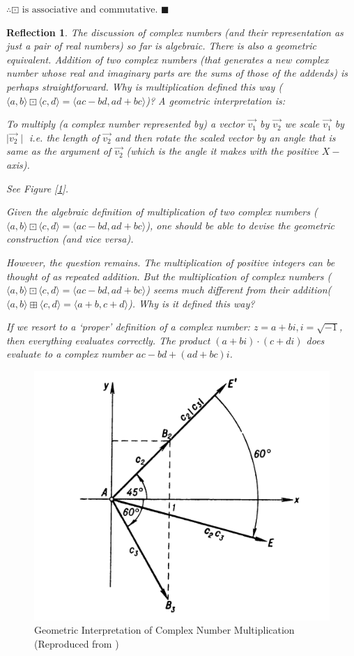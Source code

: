 \documentclass[english,notitlepage,smartquotes]{hgbreport}
\theoremstyle{definition}
\theoremstyle{problem}
\theoremstyle{remark}
\theoremstyle{plain}
\renewcommand\qedsymbol{$\blacksquare$}
\newtheorem{reflection}{Reflection}
\begin{document}
$\therefore \boxdot \text{ is associative and commutative}$. 
\qedsymbol
\begin{reflection}
The discussion of complex numbers (and their representation as just a pair of real numbers) so far is algebraic. There is also a geometric equivalent. Addition of two complex numbers (that generates a new complex number whose real and imaginary parts are the sums of those of the addends) is perhaps straightforward. Why is multiplication defined this way ($\langle a,b\rangle\boxdot\langle c,d\rangle=\langle ac-bd,ad+bc\rangle$)? A geometric interpretation is:
\begin{sidebar}
To multiply (a complex number represented by) a vector $\vec{v_1}$ by $\vec{v_2}$ we \textit{scale} $\vec{v_1}$ by $\mid \vec{v_2}\mid$ i.e. the length of $\vec{v_2}$ and then rotate the scaled vector by an angle that is same as the argument of $\vec{v_2}$ (which is the angle it makes with the positive $X-$axis).

See Figure [\ref{fig:complexmult}].
\end{sidebar} 
Given the algebraic definition of multiplication of two complex numbers ($\langle a,b\rangle\boxdot\langle c,d\rangle=    \langle ac-bd,ad+bc\rangle$), one should be able to devise the geometric construction (and vice versa).

However, the question remains. The multiplication of positive integers can be thought of as repeated addition. But the multiplication of complex numbers ($\langle a,b\rangle\boxdot\langle c,d\rangle=    \langle ac-bd,ad+bc\rangle$) seems much different from their addition($\langle a,b\rangle\boxplus\langle c,d\rangle=\langle a+b,c+d\rangle$). Why is it defined this way?

If we resort to a `proper' definition of a complex number: $z=a+bi, i=\sqrt{-1}$, then everything evaluates correctly. The product $(a+bi)\cdot(c+di)$ does evaluate to a complex number $ac-bd+(ad+bc)i$.
\end{reflection}
\begin{figure}[h]
\begin{center}
\caption{Geometric Interpretation of Complex Number Multiplication (Reproduced from \cite{AleksanovaMarkushevich1982})}
\label{fig:complexmult}
\includegraphics[width=.3\textwidth]{c1xc2} 
\end{center}
\end{figure}
\end{document}
